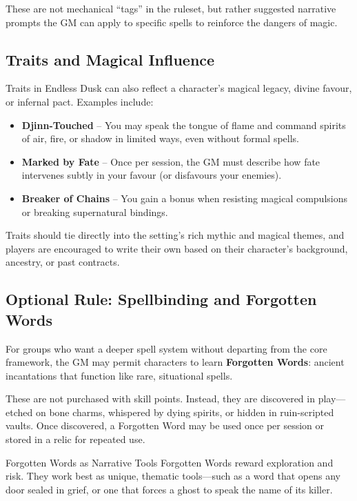These are not mechanical “tags” in the ruleset, but rather suggested narrative prompts the GM can apply to specific spells to reinforce the dangers of magic.

\subsection{Traits and Magical Influence}

Traits in Endless Dusk can also reflect a character’s magical legacy, divine favour, or infernal pact. Examples include:

\begin{itemize}\raggedright
    \item \textbf{Djinn-Touched} – You may speak the tongue of flame and command spirits of air, fire, or shadow in limited ways, even without formal spells.
    \item \textbf{Marked by Fate} – Once per session, the GM must describe how fate intervenes subtly in your favour (or disfavours your enemies).
    \item \textbf{Breaker of Chains} – You gain a bonus when resisting magical compulsions or breaking supernatural bindings.
\end{itemize}

Traits should tie directly into the setting’s rich mythic and magical themes, and players are encouraged to write their own based on their character’s background, ancestry, or past contracts.

\subsection{Optional Rule: Spellbinding and Forgotten Words}

For groups who want a deeper spell system without departing from the core framework, the GM may permit characters to learn \textbf{Forgotten Words}: ancient incantations that function like rare, situational spells.

These are not purchased with skill points. Instead, they are discovered in play—etched on bone charms, whispered by dying spirits, or hidden in ruin-scripted vaults. Once discovered, a Forgotten Word may be used once per session or stored in a relic for repeated use.

\begin{CommentBox}{Forgotten Words as Narrative Tools}
    Forgotten Words reward exploration and risk. They work best as unique, thematic tools—such as a word that opens any door sealed in grief, or one that forces a ghost to speak the name of its killer.
\end{CommentBox}
